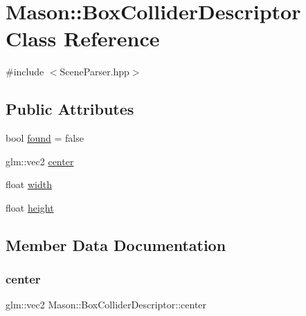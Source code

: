 \hypertarget{class_mason_1_1_box_collider_descriptor}{}\section{Mason\+:\+:Box\+Collider\+Descriptor Class Reference}
\label{class_mason_1_1_box_collider_descriptor}


{\ttfamily \#include $<$Scene\+Parser.\+hpp$>$}

\subsection*{Public Attributes}
\begin{DoxyCompactItemize}
\item 
bool \hyperlink{class_mason_1_1_box_collider_descriptor_a2d5e6513971fcc6d8a0ce78a8985f909}{found} = false
\item 
glm\+::vec2 \hyperlink{class_mason_1_1_box_collider_descriptor_a76bdf93a5c562a89e1f513b2f4ee7a65}{center}
\item 
float \hyperlink{class_mason_1_1_box_collider_descriptor_ae147e1798e9ef8855faaf51ce4bac9c4}{width}
\item 
float \hyperlink{class_mason_1_1_box_collider_descriptor_a7ed17142f44ec7337d38b34674b9e292}{height}
\end{DoxyCompactItemize}


\subsection{Member Data Documentation}
\hypertarget{class_mason_1_1_box_collider_descriptor_a76bdf93a5c562a89e1f513b2f4ee7a65}{}\label{class_mason_1_1_box_collider_descriptor_a76bdf93a5c562a89e1f513b2f4ee7a65} 
\subsubsection{\texorpdfstring{center}{center}}
{\footnotesize\ttfamily glm\+::vec2 Mason\+::\+Box\+Collider\+Descriptor\+::center}

\hypertarget{class_mason_1_1_box_collider_descriptor_a2d5e6513971fcc6d8a0ce78a8985f909}{}\label{class_mason_1_1_box_collider_descriptor_a2d5e6513971fcc6d8a0ce78a8985f909} 
